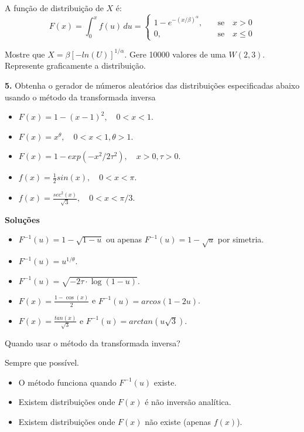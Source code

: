 \documentclass[
]{book}
\begin{document}
A função de distribuição de \(X\) é:
\[F(x) = \int_{0}^{x}f(u)\, du = \begin{cases}
1-e^{-(x/\beta)^\alpha},& \quad \text{se} \quad x>0\\
0,& \quad \text{se} \quad x\leq 0
\end{cases}\]

Mostre que \(X = \beta[-ln(U)]^{1/\alpha}\). Gere 10000 valores de uma
\(W(2,3)\). Represente graficamente a distribuição.

\textbf{5.} Obtenha o gerador de números aleatórios das distribuições
especificadas abaixo usando o método da transformada inversa

\begin{itemize}
\item
  \(F(x) = 1-(x-1)^2, \quad 0<x<1\).
\item
  \(F(x) = x^{\theta}, \quad 0<x<1, \theta>1\).
\item
  \(F(x) = 1-exp(-x^2/2\tau^2), \quad x>0, \tau>0\).
\item
  \(f(x) = \frac{1}{2}sin(x), \quad 0<x<\pi\).
\item
  \(f(x) = \frac{sec^2(x)}{\sqrt{3}}, \quad 0<x<\pi/3\).
\end{itemize}

\textbf{Soluções}

\begin{itemize}
\item
  \(F^{-1}(u) = 1-\sqrt{1-u}\) ou apenas \(F^{-1}(u)=1-\sqrt{u}\) por
  simetria.
\item
  \(F^{-1}(u) = u^{1/\theta}\).
\item
  \(F^{-1}(u) = \sqrt{-2\tau \cdot \log(1-u)}\).
\item
  \(F(x) = \frac{1-\cos(x)}{2}\) e \(F^{-1}(u)=arcos(1-2u)\).
\item
  \(F(x) = \frac{tan(x)}{\sqrt{3}}\) e \(F^{-1}(u) = arctan(u\sqrt3)\).
\end{itemize}

Quando usar o método da transformada inversa?

Sempre que possível.

\begin{itemize}
\item
  O método funciona quando \(F^{-1}(u)\) existe.
\item
  Existem distribuições onde \(F(x)\) é não inversão analítica.
\item
  Existem distribuições onde \(F(x)\) não existe (apenas \(f(x)\)).
\end{itemize}
\end{document}
